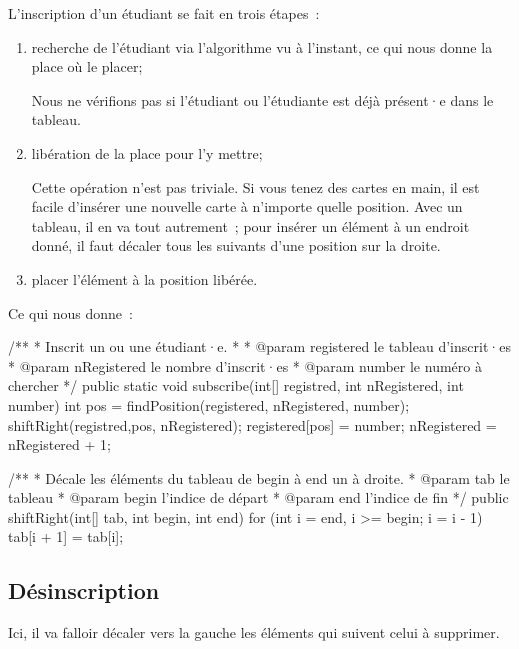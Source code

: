 			L’inscription d’un étudiant se fait en trois étapes~:
			\begin{enumerate}
			\item
				recherche de l’étudiant via l’algorithme vu à l'instant,
				ce qui nous donne la place où le placer;

				Nous ne vérifions pas si l'étudiant ou l'étudiante est déjà 
				présent·e dans le tableau. 

			\item
				libération de la place pour l’y mettre;
				
				Cette opération n’est pas triviale.  Si vous tenez des cartes en
				main, il est facile d’insérer une nouvelle carte à n’importe
				quelle position.  Avec un tableau, il en va tout autrement~;
				pour insérer un élément à un endroit donné, il faut décaler tous
				les suivants d’une position sur la droite.
			
			\item
				placer l’élément à la position libérée.
			\end{enumerate} 
			
			Ce qui nous donne~:
			

			\begin{java}
/**
 * Inscrit un ou une étudiant·e.
 * 
 * @param registered le tableau d'inscrit·es
 * @param nRegistered le nombre d'inscrit·es
 * @param number le numéro à chercher
 */
public static void subscribe(int[] registred, int nRegistered,
				int number){
	int pos = findPosition(registered, nRegistered, number);
	shiftRight(registred,pos, nRegistered);
	registered[pos] = number;
	nRegistered = nRegistered + 1;
}

/**
 * Décale les éléments du tableau de begin à end un à droite.
 * @param tab le tableau
 * @param begin l'indice de départ
 * @param end l'indice de fin
 */
public shiftRight(int[] tab, int begin, int end){
	for (int i = end, i >= begin; i = i - 1){
		tab[i + 1] = tab[i];
	}
}
			\end{java}

			
		\subsection{Désinscription}
		
			Ici, il va falloir décaler vers la gauche
			les éléments qui suivent celui à supprimer.


